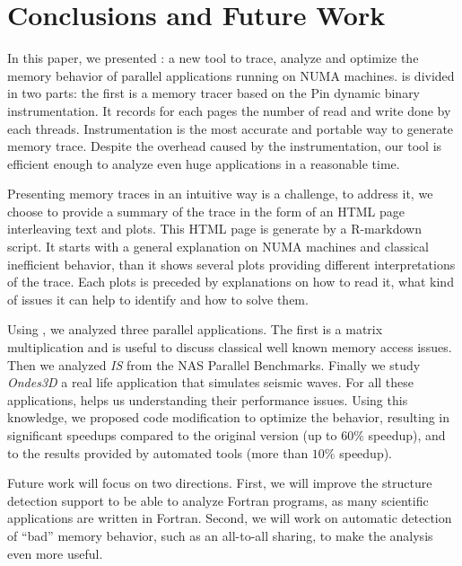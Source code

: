
\section{Conclusions and Future Work}
\label{sec:concl}

In this paper, we presented \TABARNAC: a new tool to trace, analyze and
optimize the memory behavior of parallel applications running on NUMA
machines. \TABARNAC is divided in two parts: the first is a memory tracer
based on the Pin dynamic binary instrumentation. It records for each pages the
number of read and write done by each threads. Instrumentation is the most
accurate and portable way to generate memory trace.
Despite the overhead caused by the instrumentation, our tool is efficient enough to analyze even huge applications in a reasonable time.

Presenting memory traces in an intuitive way is a challenge, to address it, we
choose to provide a summary of the trace in the form of an HTML page
interleaving text and plots. This HTML page is generate by a R-markdown
script. It starts with a general explanation on NUMA machines and classical
inefficient behavior, than it shows several plots providing different
interpretations of the trace. Each plots is preceded by explanations on how to
read it, what kind of issues it can help to identify and how to solve them.

Using \TABARNAC, we analyzed three parallel applications. The first is a
matrix multiplication and is useful to discuss classical well known memory access issues.
Then we analyzed \emph{IS} from the NAS Parallel Benchmarks. Finally we study
\emph{Ondes3D} a real life application that simulates seismic waves. For all
these applications, \TABARNAC helps us understanding their performance issues.
Using this knowledge, we proposed code modification to optimize the behavior, resulting in
significant speedups compared to the original version (up to $60\%$ speedup),
and to the results provided by automated tools (more than $10\%$ speedup).

Future work will focus on two directions. First, we will improve the
structure detection support to be able to analyze Fortran programs, as many
scientific applications are written in Fortran. Second, we will work
on automatic detection of ``bad'' memory behavior, such as an all-to-all sharing,
to make the analysis even more useful.
